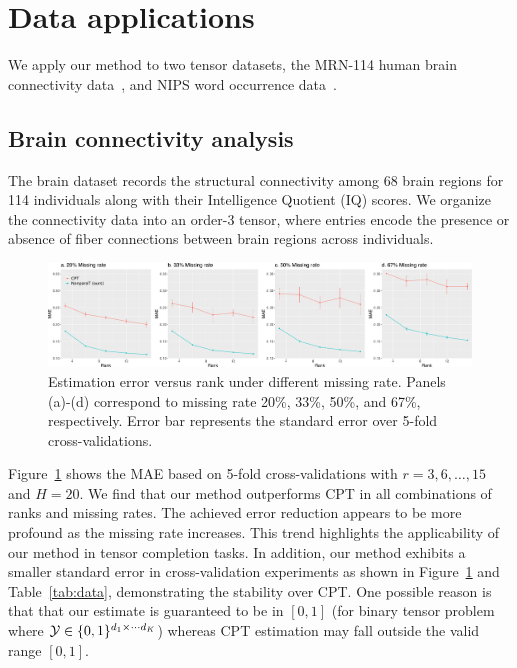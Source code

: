 \documentclass[twoside,11pt]{article}
\theoremstyle{plain}
\theoremstyle{definition}
\begin{document}
\section{Data applications}\label{sec:dataapp}
We apply our method to two tensor datasets, the MRN-114 human brain connectivity data~\citep{wang2017bayesian}, and NIPS word occurrence data~\citep{globerson2007euclidean}. 

\subsection{Brain connectivity analysis}
The brain dataset records the structural connectivity among 68 brain regions for 114 individuals along with their Intelligence Quotient (IQ) scores. We organize the connectivity data into an order-3 tensor, where entries encode the presence or absence of fiber connections between brain regions across individuals. 

\begin{figure}[h!]
\includegraphics[width = \textwidth]{figure/brain_sim.pdf}
\caption{Estimation error versus rank under different missing rate. Panels (a)-(d) correspond to missing rate 20\%, 33\%, 50\%, and 67\%, respectively. Error bar represents the standard error over 5-fold cross-validations.}\label{fig:braincv}
\end{figure}

Figure~\ref{fig:braincv} shows the MAE based on 5-fold cross-validations with $r = 3,6,\ldots, 15$ and $H = 20$. We find that our method outperforms CPT in all combinations of ranks and missing rates. The achieved error reduction appears to be more profound as the missing rate increases. This trend highlights the applicability of our method in tensor completion tasks. In addition, our method exhibits a smaller standard error in cross-validation experiments as shown in Figure~\ref{fig:braincv} and Table~\ref{tab:data}, demonstrating the stability over CPT.  One possible reason is that that our estimate is guaranteed to be in $[0,1]$ (for binary tensor problem where $\mathcal{Y}\in\{0,1\}^{d_1\times\cdots d_K}$) whereas CPT estimation may fall outside the valid range $[0,1]$. 
\end{document}
